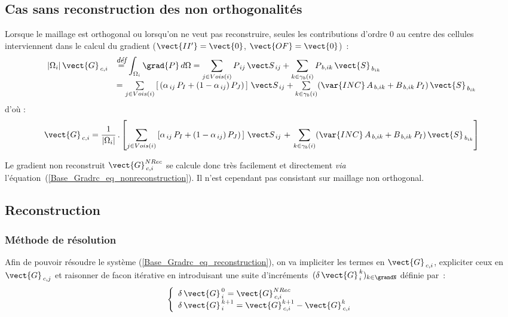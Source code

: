 \subsection{\bf Cas sans reconstruction des non orthogonalit\'es}
Lorsque le maillage est orthogonal ou lorsqu'on ne veut pas reconstruire, seules
les contributions d'ordre $0$ au centre des cellules interviennent dans le
calcul du gradient ($\vect{II'} = \vect{0}$, $\vect{OF} = \vect{0}$)~:
\begin{equation}\notag
\begin{array}{ll}
|\Omega_i|\,\vect{G}_{\,c,i}&\overset{\text{\it\small d\'ef}}{=} \displaystyle\int_{\Omega_i}{\grad{P}\, d\Omega}
=\sum\limits_{j\in Vois(i)}P_{\,ij}\,{\vect S_{\,ij}} + \sum\limits_{k\in {\gamma_b(i)}} P_{\,b,ik}\,\vect{S}_{\,{b}_{ik}} \\
 &= \sum\limits_{j\in Vois(i)}\left[\,(\alpha_{\,ij}\,P_I +
(1 - \alpha_{\,ij})\,P_J)\,\right]\,{\vect S_{\,ij}}
+ \sum\limits_{k\in {\gamma_b(i)}} (\var{INC}\,A_{\,b,ik} + B_{\,b,ik}\,P_I )\,\vect{S}_{\,{b}_{ik}}\\
\end{array}
\end{equation}
d'o\`u :
\begin{multline}\label{Base_Gradrc_eq_nonreconstruction}
\vect{G}_{\,c,i}=\frac{1}{|\Omega_i|}\,.\left[\sum\limits_{j\in
Vois(i)}\left[\alpha_{\,ij}\,P_I + (1 - \alpha_{\,ij})\,P_J)\, \right]\,{\vect S_{\,ij}}\right.
+\left.\sum\limits_{k\in {\gamma_b(i)}}(\var{INC}\,A_{\,b,ik} + B_{\,b,ik}\,P_I
)\,\vect{S}_{\,{b}_{ik}} \right]
\end{multline}

Le gradient non reconstruit $ \vect{G}_{\,c,i}^{NRec} $ se calcule donc tr\`es
facilement et directement {\it via} l'\'equation~(\ref{Base_Gradrc_eq_nonreconstruction}).
Il n'est cependant pas consistant sur maillage non orthogonal.

\subsection{\bf Reconstruction}
\subsubsection{\bf M\'ethode de r\'esolution}

Afin de pouvoir r\'esoudre le syst\`eme (\ref{Base_Gradrc_eq_reconstruction}), on va
impliciter les termes en $\vect{G}_{\,c,i}$, expliciter ceux en
$\vect{G}_{\,c,j}$ et raisonner de facon it\'erative en introduisant une suite
d'incr\'ements~$(\delta\,\vect{G}^{\,k}_{\,i})_{k\in \grandN}$ d\'efinie par~:\\
\begin{equation}
\left\{\begin{array}{l}
\delta\,\vect{G}^{\,0}_{\,i} = \vect{G}_{\,c,i}^{NRec}\\
\delta\,\vect{G}^{\,k+1}_{\,i} = \vect{G}^{k+1}_{\,c,i}-\vect{G}^k_{\,c,i}  \end{array}\right.
\end{equation}

